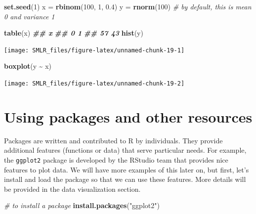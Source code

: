 \documentclass[
]{book}
\newenvironment{Shaded}{\begin{snugshade}}{\end{snugshade}}
\newcommand{\CommentTok}[1]{\textcolor[rgb]{0.56,0.35,0.01}{\textit{#1}}}
\newcommand{\DecValTok}[1]{\textcolor[rgb]{0.00,0.00,0.81}{#1}}
\newcommand{\DocumentationTok}[1]{\textcolor[rgb]{0.56,0.35,0.01}{\textbf{\textit{#1}}}}
\newcommand{\FloatTok}[1]{\textcolor[rgb]{0.00,0.00,0.81}{#1}}
\newcommand{\FunctionTok}[1]{\textcolor[rgb]{0.13,0.29,0.53}{\textbf{#1}}}
\newcommand{\NormalTok}[1]{#1}
\newcommand{\OtherTok}[1]{\textcolor[rgb]{0.56,0.35,0.01}{#1}}
\newcommand{\SpecialCharTok}[1]{\textcolor[rgb]{0.81,0.36,0.00}{\textbf{#1}}}
\newcommand{\StringTok}[1]{\textcolor[rgb]{0.31,0.60,0.02}{#1}}
\theoremstyle{definition}
\theoremstyle{definition}
\theoremstyle{definition}
\theoremstyle{definition}
\theoremstyle{remark}
\begin{document}
\begin{Shaded}
\begin{Highlighting}[]
    \FunctionTok{set.seed}\NormalTok{(}\DecValTok{1}\NormalTok{)}
\NormalTok{    x }\OtherTok{=} \FunctionTok{rbinom}\NormalTok{(}\DecValTok{100}\NormalTok{, }\DecValTok{1}\NormalTok{, }\FloatTok{0.4}\NormalTok{)}
\NormalTok{    y }\OtherTok{=} \FunctionTok{rnorm}\NormalTok{(}\DecValTok{100}\NormalTok{) }\CommentTok{\# by default, this is mean 0 and variance 1}
    
    \FunctionTok{table}\NormalTok{(x)}
\DocumentationTok{\#\# x}
\DocumentationTok{\#\#  0  1 }
\DocumentationTok{\#\# 57 43}
    \FunctionTok{hist}\NormalTok{(y)}
\end{Highlighting}
\end{Shaded}

\begin{center}\texttt{[image: SMLR\_files/figure-latex/unnamed-chunk-19-1]} \end{center}

\begin{Shaded}
\begin{Highlighting}[]
    \FunctionTok{boxplot}\NormalTok{(y }\SpecialCharTok{\textasciitilde{}}\NormalTok{ x)}
\end{Highlighting}
\end{Shaded}

\begin{center}\texttt{[image: SMLR\_files/figure-latex/unnamed-chunk-19-2]} \end{center}

\hypertarget{using-packages-and-other-resources}{%
\section{Using packages and other resources}\label{using-packages-and-other-resources}}

Packages are written and contributed to R by individuals. They provide additional features (functions or data) that serve particular needs. For example, the \texttt{ggplot2} package is developed by the RStudio team that provides nice features to plot data. We will have more examples of this later on, but first, let's install and load the package so that we can use these features. More details will be provided in the data visualization section.

\begin{Shaded}
\begin{Highlighting}[]
    \CommentTok{\# to install a package}
    \FunctionTok{install.packages}\NormalTok{(}\StringTok{"ggplot2"}\NormalTok{)}
\end{Highlighting}
\end{Shaded}
\end{document}
